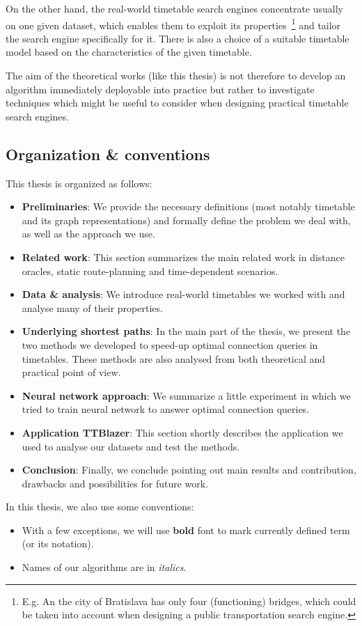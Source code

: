 	On the other hand, the real-world timetable search engines concentrate usually on one given dataset, which enables them to exploit its properties~\footnote{E.g. An the city of Bratislava has only four (functioning) bridges, which could be taken into account when designing a public transportation search engine.} and tailor the search engine specifically for it. There is also a choice of a suitable timetable model based on the characteristics of the given timetable.
	
	The aim of the theoretical works (like this thesis) is not therefore to develop an algorithm immediately deployable into practice but rather to investigate techniques which might be useful to consider when designing practical timetable search engines.
	
\subsection{Organization \& conventions}

	\noindent This thesis is organized as follows: 
	\begin{itemize}
		\item \textbf{Preliminaries}: We provide the necessary definitions (most notably timetable and its graph representations) and formally define the problem we deal with, as well as the approach we use.
		\item \textbf{Related work}: This section summarizes the main related work in distance oracles, static route-planning and time-dependent scenarios.
		\item \textbf{Data \& analysis}: We introduce real-world timetables we worked with and analyse many of their properties.
		\item \textbf{Underlying shortest paths}: In the main part of the thesis, we present the two methods we developed to speed-up optimal connection queries in timetables. These methods are also analysed from both theoretical and practical point of view.
		\item \textbf{Neural network approach}: We summarize a little experiment in which we tried to train neural network to answer optimal connection queries.
		\item \textbf{Application TTBlazer}: This section shortly describes the application we used to analyse our datasets and test the methods.
		\item \textbf{Conclusion}: Finally, we conclude pointing out main results and contribution, drawbacks and possibilities for future work.
	\end{itemize}
	\hspace{\fill}
	
	\noindent In this thesis, we also use some conventions:
	\begin{itemize}
		\item With a few exceptions, we will use \textbf{bold} font to mark currently defined term (or its notation).
		\item Names of our algorithms are in \textit{italics}.
	\end{itemize}
	